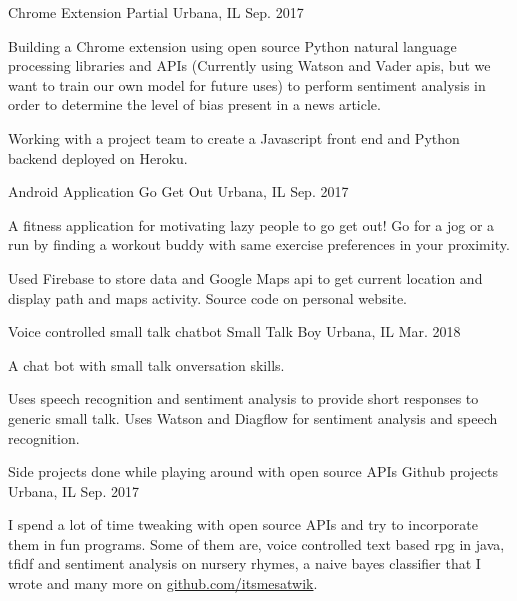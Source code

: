 \begin{cventries}
  \cventry
    {Chrome Extension}
    {Partial}
    {Urbana, IL}
    {Sep. 2017}
    {
        \begin{cvitems}
          \item {Building a Chrome extension using open source Python natural language processing libraries and APIs (Currently using Watson and Vader apis, but we want to train our own model for future uses) to perform sentiment analysis in order to determine the level of bias present in a news article.}
          \item {Working with a project team to create a Javascript front end and Python backend deployed on Heroku.}
          \end{cvitems}
    }
    \cventry
    {Android Application}
    {Go Get Out}
    {Urbana, IL}
    {Sep. 2017}
    {
        \begin{cvitems}
          \item {A fitness application for motivating lazy people to go get out! Go for a jog or a run by finding a workout buddy with same exercise preferences in your proximity.}
          \item {Used Firebase to store data and Google Maps api to get current location and display path and maps activity. Source code on personal website.}
          \end{cvitems}
    }
    \cventry
    {Voice controlled small talk chatbot}
    {Small Talk Boy}
    {Urbana, IL}
    {Mar. 2018}
    {
        \begin{cvitems}
          \item {A chat bot with small talk onversation skills.}
          \item {Uses speech recognition and sentiment analysis to provide short responses to generic small talk. Uses Watson and Diagflow for sentiment analysis and speech recognition.}
          \end{cvitems}
    }
    \cventry
    {Side projects done while playing around with open source APIs}
    {Github projects}
    {Urbana, IL}
    {Sep. 2017}
    {
        \begin{cvitems}
          \item {I spend a lot of time tweaking with open source APIs and try to incorporate them in fun programs. Some of them are, voice controlled text based rpg in java, tfidf and sentiment analysis on nursery rhymes, a naive bayes classifier that I wrote and many more on \url{github.com/itsmesatwik}.}
          \end{cvitems}
    }
\end{cventries}
